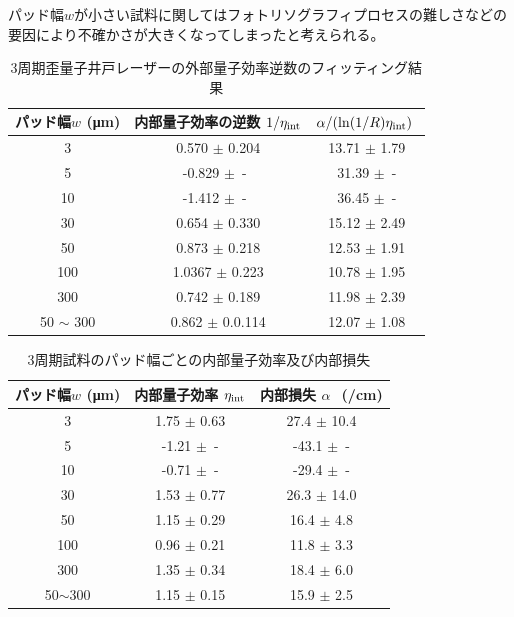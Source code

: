 {パッド幅$w$が小さい試料に関してはフォトリソグラフィプロセスの難しさなどの要因により不確かさが大きくなってしまったと考えられる。

\begin{table}[h]
  \caption{3周期歪量子井戸レーザーの外部量子効率逆数のフィッティング結果}
  \label{table:table_3QW_i_d_fit}
  \centering
  \begin{tabular}{ccc}
    \hline
    パッド幅$w$ (\si{\micro\metre})  &  内部量子効率の逆数 $1/\eta_{\rm{int}} $ & $\alpha/(\ln(1/R)\eta_{\rm{int}})\ $ \\
    \hline \hline
     3 & 0.570 $\pm$ 0.204  & 13.71 $\pm$ 1.79 \\
    5  & -0.829 $\pm$\ -\ & 31.39 $\pm$\ -\\
    10  & -1.412 $\pm$\ -\  & 36.45 $\pm$\ -\\ 
    30& 0.654 $\pm$ 0.330& 15.12 $\pm$ 2.49\\
    50& 0.873 $\pm$ 0.218&12.53 $\pm$ 1.91 \\
    100& 1.0367 $\pm$ 0.223& 10.78 $\pm$ 1.95\\
    300&0.742 $\pm$ 0.189 & 11.98 $\pm$ 2.39\\
    \hline
    50 $\sim$ 300 & 0.862 $\pm$ 0.0.114 & 12.07 $\pm$ 1.08\\
    \hline

  \end{tabular}
\end{table}


\begin{table}[h]
  \caption{3周期試料のパッド幅ごとの内部量子効率及び内部損失}
  \label{table:table_3QW_i_int}
  \centering
  \begin{tabular}{ccc}
    \hline
    パッド幅$w$ (\si{\micro\metre})  &  内部量子効率 $\eta_{\rm{int}} $ &内部損失 $\alpha\ $\ (/\si{cm}) \\
    \hline \hline
     3 & 1.75 $\pm$ 0.63 & 27.4 $\pm$ 10.4  \\
    5  & -1.21 $\pm$\ - & -43.1 $\pm$\ -\\
    10  & -0.71 $\pm$\ - & -29.4 $\pm$\ -\\ 
    30& 1.53 $\pm$ 0.77& 26.3 $\pm$ 14.0\\
    50& 1.15 $\pm$ 0.29&16.4 $\pm$ 4.8 \\
    100& 0.96 $\pm$ 0.21& 11.8 $\pm$ 3.3\\
    300&1.35 $\pm$ 0.34 & 18.4 $\pm$ 6.0\\
    \hline
    50$\sim$300& 1.15 $\pm$ 0.15 & 15.9 $\pm$ 2.5\\
    \hline
  \end{tabular}
\end{table}


}
